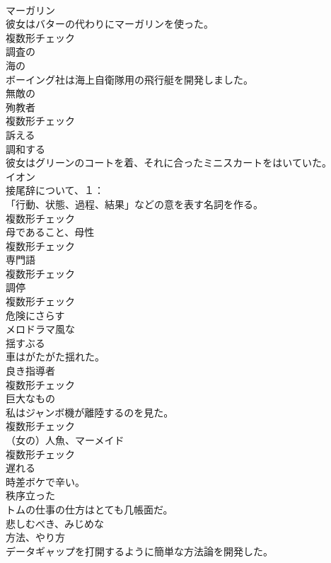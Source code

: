 \documentclass[8pt]{extreport}
\begin{document}
\begin{CJK}{UTF8}{min}
\\	[名詞]	マーガリン	
\\	彼女はバターの代わりにマーガリンを使った。	
\\	複数形チェック
\\	[形容詞]	調査の	
\\	[形容詞]	海の	
\\	ボーイング社は海上自衛隊用の飛行艇を開発しました。	
\\	[形容詞]	無敵の	
\\	[名詞]	殉教者	
\\	複数形チェック
\\	[動詞]	訴える	
\\	[形容詞]	調和する	
\\	彼女はグリーンのコートを着、それに合ったミニスカートをはいていた。	
\\	[名詞]	イオン	
\\	接尾辞について、１：
\\	「行動、状態、過程、結果」などの意を表す名詞を作る。	
\\	複数形チェック
\\	[名詞]	母であること、母性	
\\	複数形チェック
\\	[名詞]	専門語	
\\	複数形チェック
\\	[名詞]	調停	
\\	複数形チェック
\\	[動詞]	危険にさらす	
\\	[形容詞]	メロドラマ風な	
\\	[動詞]	揺すぶる	
\\	車はがたがた揺れた。	
\\	[名詞]	良き指導者	
\\	複数形チェック
\\	[名詞]	巨大なもの	
\\	私はジャンボ機が離陸するのを見た。	
\\	複数形チェック
\\	[名詞]	（女の）人魚、マーメイド	
\\	複数形チェック
\\	[動詞]	遅れる	
\\	時差ボケで辛い。	
\\	[形容詞]	秩序立った	
\\	トムの仕事の仕方はとても几帳面だ。	
\\	[形容詞]	悲しむべき、みじめな	
\\	[名詞]	方法、やり方	
\\	データギャップを打開するように簡単な方法論を開発した。	

\end{CJK}
\end{document}
